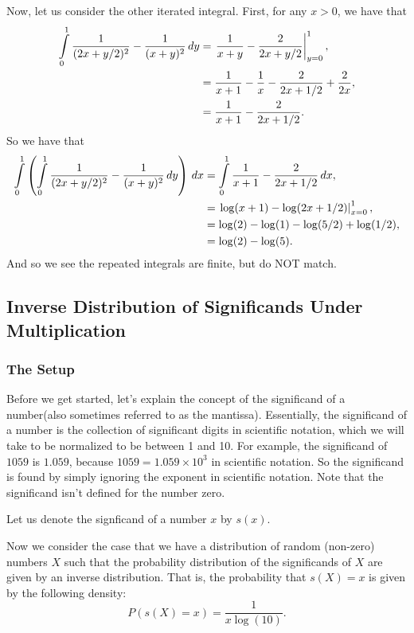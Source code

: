 Now, let us consider the other iterated integral. First, for any \(x > 0\), we have that
\begin{align}
\int\limits_0^1 \frac{1}{(2x + y/2)^2} - \frac{1}{(x+y)^2} \, dy & = \left.\frac{1}{x+y} - \frac{2}{2x + y/2}\right|_{y = 0}^1, \\
    & = \frac{1}{x+1} - \frac{1}{x} -\frac{2}{2x+1/2} + \frac{2}{2x}, \\ 
    & = \frac{1}{x+1} - \frac{2}{2x+1/2}.
\end{align}
So we have that
\begin{align}
\int\limits_0^1 \left(\int\limits_0^1 \frac{1}{(2x + y/2)^2} - \frac{1}{(x+y)^2} \, dy\right) \, dx & = \int\limits_0^1 \frac{1}{x+1} - \frac{2}{2x+1/2} \, dx, \\
    & = \left. \log(x+1) - \log(2x + 1/2)\right|_{x = 0}^1, \\
    & = \log(2) - \log(1) - \log(5/2) + \log(1/2), \\
    & = \log(2) - \log(5). 
\end{align}
And so we see the repeated integrals are finite, but do NOT match.



\subsection{Inverse Distribution of Significands Under Multiplication}

\subsubsection*{The Setup}

Before we get started, let's explain the concept of the significand of a number(also sometimes referred to as the mantissa). Essentially, the significand of a
number is the collection of significant digits in scientific notation, which we will take to be normalized to be between 1 and 10. For example, the
significand of \(1059\) is \(1.059\), because \(1059 = 1.059 \times 10^3\) in scientific notation. So the significand is found by simply ignoring the exponent
in scientific notation. Note that the significand isn't defined for the number zero. 

Let us denote the signficand of a number \(x\) by \(s(x)\).

Now we consider the case that we have a distribution of random (non-zero) numbers \(X\) such that the probability distribution of the significands of \(X\) are given by
an inverse distribution. That is, the probability that \(s(X) = x\) is given by the following density:
\begin{equation}
P\left(s(X) = x\right) = \frac{1}{x\log(10)}.
\end{equation}

